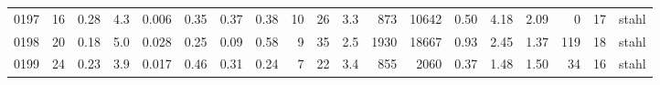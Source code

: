 {\begin{longtable}{@{}lrrrrrrrrrrrrrrrrrl@{}}
0197 & 16 & \num{0.28} & \num{4.3} & \num{0.006} & \num{0.35} & \num{0.37} & \num{0.38} & 10 & \num{26} & \num{3.3} & \num{873} & \num{10642} & \num{0.50} & \num{4.18} & \num{2.09} & \num{0} & \num{17} & stahl \\
0198 & 20 & \num{0.18} & \num{5.0} & \num{0.028} & \num{0.25} & \num{0.09} & \num{0.58} & 9 & \num{35} & \num{2.5} & \num{1930} & \num{18667} & \num{0.93} & \num{2.45} & \num{1.37} & \num{119} & \num{18} & stahl \\
0199 & 24 & \num{0.23} & \num{3.9} & \num{0.017} & \num{0.46} & \num{0.31} & \num{0.24} & 7 & \num{22} & \num{3.4} & \num{855} & \num{2060} & \num{0.37} & \num{1.48} & \num{1.50} & \num{34} & \num{16} & stahl \\
\bottomrule\end{longtable}}
